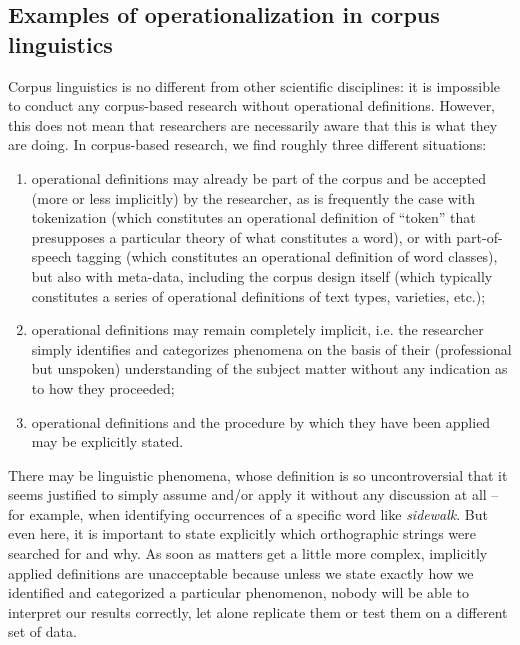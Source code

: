 \subsection{Examples of operationalization in corpus linguistics}
\label{sec:operationalcorpuslinguistics}

Corpus linguistics is no different from other scientific disciplines: it is impossible to conduct any corpus-based research without operational definitions. However, this does not mean that researchers are necessarily aware that this is what they are doing. In corpus-based research, we find roughly three different situations:

\begin{enumerate}
\item operational definitions may already be part of the corpus and be accepted (more or less implicitly) by the researcher, as is frequently the case with tokenization (which constitutes an operational definition of ``token'' that presupposes a particular theory of what constitutes a word), or with part-of-speech tagging (which constitutes an operational definition of word classes), but also with meta-data, including the corpus design itself (which typically constitutes a series of operational definitions of text types, varieties, etc.);
\item operational definitions may remain completely implicit, i.e. the researcher simply identifies and categorizes phenomena on the basis of their (professional but unspoken) understanding of the subject matter without any indication as to how they proceeded;
\item operational definitions and the procedure by which they have been applied may be explicitly stated.
\end{enumerate}

There may be linguistic phenomena, whose definition is so uncontroversial that it seems justified to simply assume and/or apply it without any discussion at all -- for example, when identifying occurrences of a specific word like \textit{sidewalk}. But even here, it is important to state explicitly which orthographic strings were searched for and why. As soon as matters get a little more complex, implicitly applied definitions are unacceptable because unless we state exactly how we identified and categorized a particular phenomenon, nobody will be able to interpret our results correctly, let alone replicate them or test them on a different set of data.

